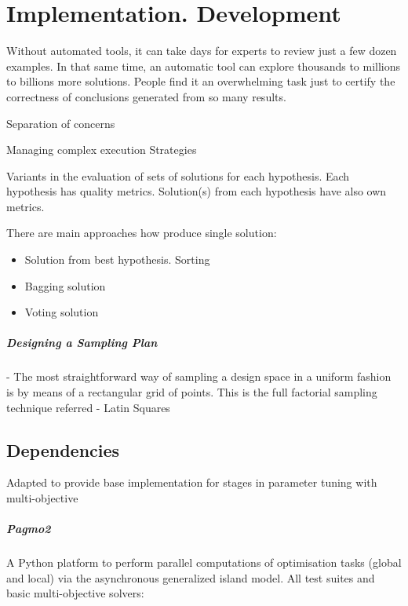 \chapter{Implementation. Development}

Without automated tools, it can take days for experts to review just a few dozen examples.  In that same time, an automatic tool can explore thousands to millions to billions more solutions. People find it an overwhelming task just to certify the correctness of conclusions generated from so many results.

Separation of concerns

Managing complex execution Strategies

Variants in the evaluation of sets of solutions for each hypothesis. Each hypothesis has quality metrics. Solution(s) from each hypothesis have also own metrics.
               
There are main approaches how produce single solution: 
\begin{itemize}
    \item Solution from best hypothesis. Sorting
    \item Bagging solution
    \item Voting solution                
\end{itemize}

\paragraph{Designing a Sampling Plan}
 - The most straightforward way of sampling a design space in a uniform fashion is by \cite{EngSurMod}
 means of a rectangular grid of points. This is the full factorial sampling technique referred
 - Latin Squares

\section{Dependencies}
    Adapted to provide base implementation for stages in parameter tuning with multi-objective

    \paragraph{Pagmo2} 
        A Python platform \cite{francesco_biscani_2019} to perform parallel computations of optimisation tasks (global and local) via the asynchronous generalized island model.
        All test suites and basic multi-objective solvers:

